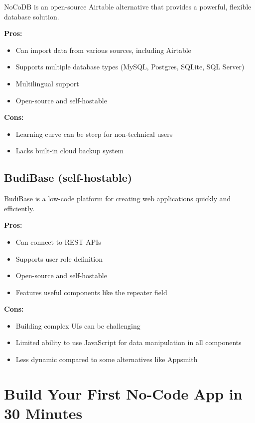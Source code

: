 NoCoDB is an open-source Airtable alternative that provides a powerful, flexible database solution.

\textbf{Pros:}
\begin{itemize}
    \item Can import data from various sources, including Airtable
    \item Supports multiple database types (MySQL, Postgres, SQLite, SQL Server)
    \item Multilingual support
    \item Open-source and self-hostable
\end{itemize}

\textbf{Cons:}
\begin{itemize}
    \item Learning curve can be steep for non-technical users
    \item Lacks built-in cloud backup system
\end{itemize}

\subsection{BudiBase (self-hostable)}

BudiBase is a low-code platform for creating web applications quickly and efficiently.

\textbf{Pros:}
\begin{itemize}
    \item Can connect to REST APIs
    \item Supports user role definition
    \item Open-source and self-hostable
    \item Features useful components like the repeater field
\end{itemize}

\textbf{Cons:}
\begin{itemize}
    \item Building complex UIs can be challenging
    \item Limited ability to use JavaScript for data manipulation in all components
    \item Less dynamic compared to some alternatives like Appsmith
\end{itemize}

\section{Build Your First No-Code App in 30 Minutes}

